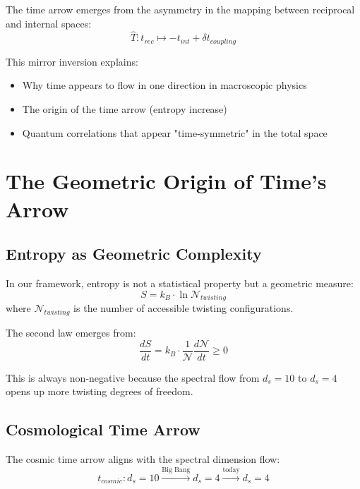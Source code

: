 The time arrow emerges from the asymmetry in the mapping between reciprocal and internal spaces:
\begin{equation}
    \hat{T}: t_{rec} \mapsto -t_{int} + \delta t_{coupling}
\end{equation}

This mirror inversion explains:
\begin{itemize}
    \item Why time appears to flow in one direction in macroscopic physics
    \item The origin of the time arrow (entropy increase)
    \item Quantum correlations that appear "time-symmetric" in the total space
\end{itemize}

\section{The Geometric Origin of Time's Arrow}

\subsection{Entropy as Geometric Complexity}

In our framework, entropy is not a statistical property but a geometric measure:
\begin{equation}
    S = k_B \cdot \ln \mathcal{N}_{twisting}
\end{equation}
where $\mathcal{N}_{twisting}$ is the number of accessible twisting configurations.

The second law emerges from:
\begin{equation}
    \frac{dS}{dt} = k_B \cdot \frac{1}{\mathcal{N}}\frac{d\mathcal{N}}{dt} \geq 0
\end{equation}

This is always non-negative because the spectral flow from $d_s = 10$ to $d_s = 4$ opens up more twisting degrees of freedom.

\subsection{Cosmological Time Arrow}

The cosmic time arrow aligns with the spectral dimension flow:
\begin{equation}
    t_{cosmic}: d_s = 10 \xrightarrow{\text{Big Bang}} d_s = 4 \xrightarrow{\text{today}} d_s = 4
\end{equation}

